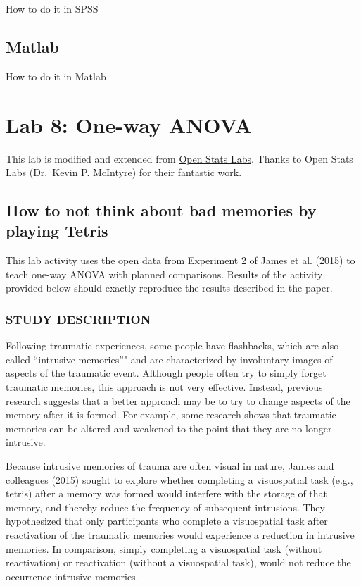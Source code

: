 \documentclass[]{book}
\theoremstyle{definition}
\theoremstyle{definition}
\theoremstyle{definition}
\theoremstyle{remark}
\begin{document}
How to do it in SPSS

\section{Matlab}\label{matlab-6}

How to do it in Matlab

\chapter{Lab 8: One-way ANOVA}\label{lab-8-one-way-anova}

This lab is modified and extended from
\href{https://sites.trinity.edu/osl}{Open Stats Labs}. Thanks to Open
Stats Labs (Dr.~Kevin P. McIntyre) for their fantastic work.

\section{How to not think about bad memories by playing
Tetris}\label{how-to-not-think-about-bad-memories-by-playing-tetris}

This lab activity uses the open data from Experiment 2 of James et al.
(2015) to teach one-way ANOVA with planned comparisons. Results of the
activity provided below should exactly reproduce the results described
in the paper.

\subsection{STUDY DESCRIPTION}\label{study-description-2}

Following traumatic experiences, some people have flashbacks, which are
also called ``intrusive memories''" and are characterized by involuntary
images of aspects of the traumatic event. Although people often try to
simply forget traumatic memories, this approach is not very effective.
Instead, previous research suggests that a better approach may be to try
to change aspects of the memory after it is formed. For example, some
research shows that traumatic memories can be altered and weakened to
the point that they are no longer intrusive.

Because intrusive memories of trauma are often visual in nature, James
and colleagues (2015) sought to explore whether completing a
visuospatial task (e.g., tetris) after a memory was formed would
interfere with the storage of that memory, and thereby reduce the
frequency of subsequent intrusions. They hypothesized that only
participants who complete a visuospatial task after reactivation of the
traumatic memories would experience a reduction in intrusive memories.
In comparison, simply completing a visuospatial task (without
reactivation) or reactivation (without a visuospatial task), would not
reduce the occurrence intrusive memories.
\end{document}
